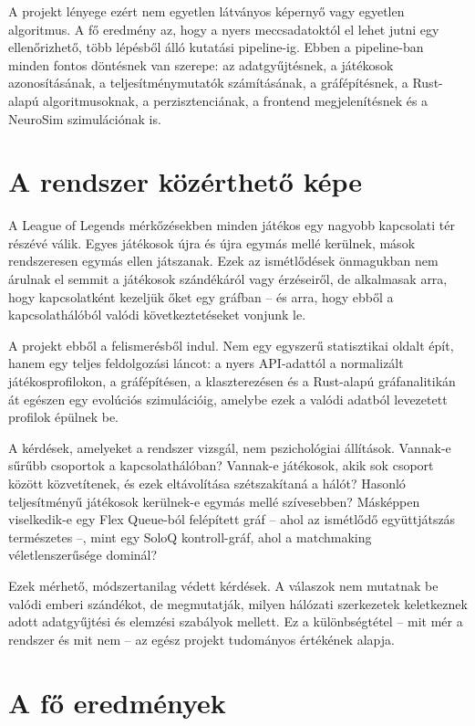 ﻿\documentclass[a4paper,12pt]{report}
\begin{document}
A projekt lényege ezért nem egyetlen látványos képernyő vagy egyetlen algoritmus. A fő eredmény az,
hogy a nyers meccsadatoktól el lehet jutni egy ellenőrizhető, több lépésből álló kutatási
pipeline-ig. Ebben a pipeline-ban minden fontos döntésnek van szerepe: az adatgyűjtésnek,
a játékosok azonosításának, a teljesítménymutatók számításának, a gráfépítésnek, a Rust-alapú
algoritmusoknak, a perzisztenciának, a frontend megjelenítésnek és a NeuroSim szimulációnak is.

\section{A rendszer közérthető képe}

A League of Legends mérkőzésekben minden játékos egy nagyobb kapcsolati tér részévé válik.
Egyes játékosok újra és újra egymás mellé kerülnek, mások rendszeresen egymás ellen játszanak.
Ezek az ismétlődések önmagukban nem árulnak el semmit a játékosok szándékáról vagy érzéseiről,
de alkalmasak arra, hogy kapcsolatként kezeljük őket egy gráfban -- és arra, hogy ebből a
kapcsolathálóból valódi következtetéseket vonjunk le.

A projekt ebből a felismerésből indul. Nem egy egyszerű statisztikai oldalt épít, hanem egy
teljes feldolgozási láncot: a nyers API-adattól a normalizált játékosprofilokon, a gráfépítésen,
a klaszterezésen és a Rust-alapú gráfanalitikán át egészen egy evolúciós szimulációig, amelybe
ezek a valódi adatból levezetett profilok épülnek be.

A kérdések, amelyeket a rendszer vizsgál, nem pszichológiai állítások. Vannak-e sűrűbb csoportok
a kapcsolathálóban? Vannak-e játékosok, akik sok csoport között közvetítenek, és ezek eltávolítása
szétszakítaná a hálót? Hasonló teljesítményű játékosok kerülnek-e egymás mellé szívesebben?
Másképpen viselkedik-e egy Flex Queue-ból felépített gráf -- ahol az ismétlődő együttjátszás
természetes --, mint egy SoloQ kontroll-gráf, ahol a matchmaking véletlenszerűsége dominál?

Ezek mérhető, módszertanilag védett kérdések. A válaszok nem mutatnak be valódi emberi szándékot,
de megmutatják, milyen hálózati szerkezetek keletkeznek adott adatgyűjtési és elemzési szabályok
mellett. Ez a különbségtétel -- mit mér a rendszer és mit nem -- az egész projekt tudományos
értékének alapja.

\section{A fő eredmények}
\end{document}
